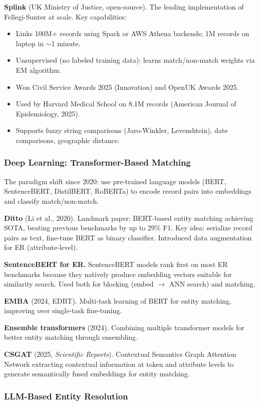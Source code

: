 \documentclass[11pt]{article}
\begin{document}
\textbf{Splink} (UK Ministry of Justice, open-source). The leading implementation of Fellegi-Sunter at scale. Key capabilities:
\begin{itemize}
\item Links 100M+ records using Spark or AWS Athena backends; 1M records on laptop in $\sim$1 minute.
\item Unsupervised (no labeled training data): learns match/non-match weights via EM algorithm.
\item Won Civil Service Awards 2025 (Innovation) and OpenUK Awards 2025.
\item Used by Harvard Medical School on 8.1M records (American Journal of Epidemiology, 2025).
\item Supports fuzzy string comparisons (Jaro-Winkler, Levenshtein), date comparisons, geographic distance.
\end{itemize}

\subsubsection{Deep Learning: Transformer-Based Matching}

The paradigm shift since 2020: use pre-trained language models (BERT, SentenceBERT, DistilBERT, RoBERTa) to encode record pairs into embeddings and classify match/non-match.

\textbf{Ditto} (Li et al., 2020). Landmark paper: BERT-based entity matching achieving SOTA, beating previous benchmarks by up to 29\% F1. Key idea: serialize record pairs as text, fine-tune BERT as binary classifier. Introduced data augmentation for ER (attribute-level).

\textbf{SentenceBERT for ER.} SentenceBERT models rank first on most ER benchmarks because they natively produce embedding vectors suitable for similarity search. Used both for blocking (embed $\to$ ANN search) and matching.

\textbf{EMBA} (2024, EDBT). Multi-task learning of BERT for entity matching, improving over single-task fine-tuning.

\textbf{Ensemble transformers} (2024). Combining multiple transformer models for better entity matching through ensembling.

\textbf{CSGAT} (2025, \textit{Scientific Reports}). Contextual Semantics Graph Attention Network extracting contextual information at token and attribute levels to generate semantically fused embeddings for entity matching.

\subsubsection{LLM-Based Entity Resolution}
\end{document}
